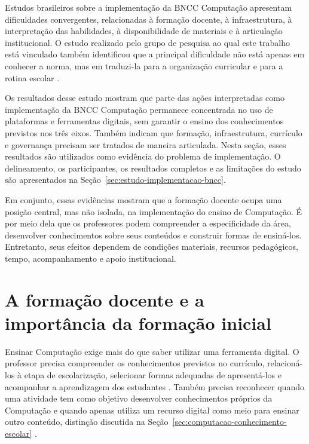 Estudos brasileiros sobre a implementação da BNCC Computação apresentam dificuldades convergentes, relacionadas à formação docente, à infraestrutura, à interpretação das habilidades, à disponibilidade de materiais e à articulação institucional. O estudo realizado pelo grupo de pesquisa ao qual este trabalho está vinculado também identificou que a principal dificuldade não está apenas em conhecer a norma, mas em traduzi-la para a organização curricular e para a rotina escolar \cite{santana2026desafios}.

Os resultados desse estudo mostram que parte das ações interpretadas como implementação da BNCC Computação permanece concentrada no uso de plataformas e ferramentas digitais, sem garantir o ensino dos conhecimentos previstos nos três eixos. Também indicam que formação, infraestrutura, currículo e governança precisam ser tratados de maneira articulada. Nesta seção, esses resultados são utilizados como evidência do problema de implementação. O delineamento, os participantes, os resultados completos e as limitações do estudo são apresentados na Seção~\ref{sec:estudo-implementacao-bncc}.

Em conjunto, essas evidências mostram que a formação docente ocupa uma posição central, mas não isolada, na implementação do ensino de Computação. É por meio dela que os professores podem compreender a especificidade da área, desenvolver conhecimentos sobre seus conteúdos e construir formas de ensiná-los. Entretanto, seus efeitos dependem de condições materiais, recursos pedagógicos, tempo, acompanhamento e apoio institucional.

\section{A formação docente e a importância da formação inicial}
\label{sec:formacao-inicial-estrutural}

Ensinar Computação exige mais do que saber utilizar uma ferramenta digital. O professor precisa compreender os conhecimentos previstos no currículo, relacioná-los à etapa de escolarização, selecionar formas adequadas de apresentá-los e acompanhar a aprendizagem dos estudantes \cite{shulman1986understanding,shulman1987knowledge}. Também precisa reconhecer quando uma atividade tem como objetivo desenvolver conhecimentos próprios da Computação e quando apenas utiliza um recurso digital como meio para ensinar outro conteúdo, distinção discutida na Seção~\ref{sec:computacao-conhecimento-escolar} \cite{royal2012shut}.

